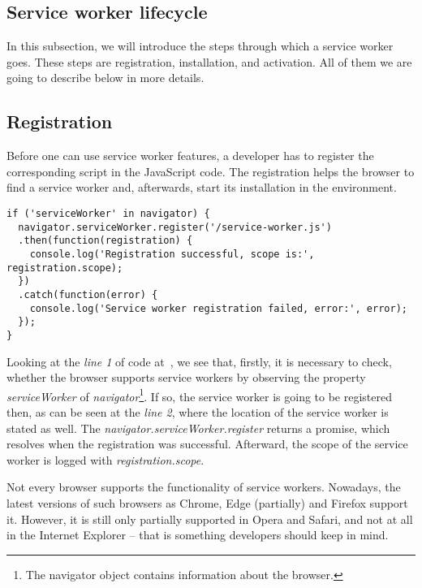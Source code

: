 \subsection{Service worker lifecycle}

In this subsection, we will introduce the steps through which a service worker goes. These steps are registration, installation, and activation. All of them we are going to describe below in more details.

\subsection*{Registration}

Before one can use service worker features, a developer has to register the corresponding script in the JavaScript code. The registration helps the browser to find a service worker and, afterwards, start its installation in the environment.

\begin{lstlisting}[caption={An example code, which demonstrates how to register a service worker\cite{32}.}, label={lst:tech1}]
if ('serviceWorker' in navigator) {
  navigator.serviceWorker.register('/service-worker.js')
  .then(function(registration) {
    console.log('Registration successful, scope is:', registration.scope);
  })
  .catch(function(error) {
    console.log('Service worker registration failed, error:', error);
  });
}
\end{lstlisting}

Looking at the \textit{line 1} of code at~, we see that, firstly, it is necessary to check, whether the browser supports service workers by observing the property \textit{serviceWorker} of \textit{navigator}\footnote{The navigator object contains information about the browser\cite{43}.}. If so, the service worker is going to be registered then, as can be seen at the \textit{line 2}, where the location of the service worker is stated as well. The \textit{navigator.serviceWorker.register} returns a promise, which resolves when the registration was successful. Afterward, the scope of the service worker is logged with \textit{registration.scope}. 

Not every browser supports the functionality of service workers. Nowadays, the latest versions of such browsers as Chrome, Edge (partially) and Firefox support it. However, it is still only partially supported in Opera and Safari, and not at all in the Internet Explorer\cite{42} -- that is something developers should keep in mind.

